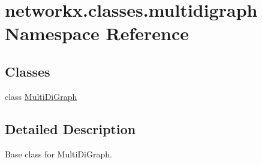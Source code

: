 \hypertarget{namespacenetworkx_1_1classes_1_1multidigraph}{}\section{networkx.\+classes.\+multidigraph Namespace Reference}
\label{namespacenetworkx_1_1classes_1_1multidigraph}
\subsection*{Classes}
\begin{DoxyCompactItemize}
\item 
class \hyperlink{classnetworkx_1_1classes_1_1multidigraph_1_1MultiDiGraph}{Multi\+Di\+Graph}
\end{DoxyCompactItemize}


\subsection{Detailed Description}
\begin{DoxyVerb}Base class for MultiDiGraph.\end{DoxyVerb}
 